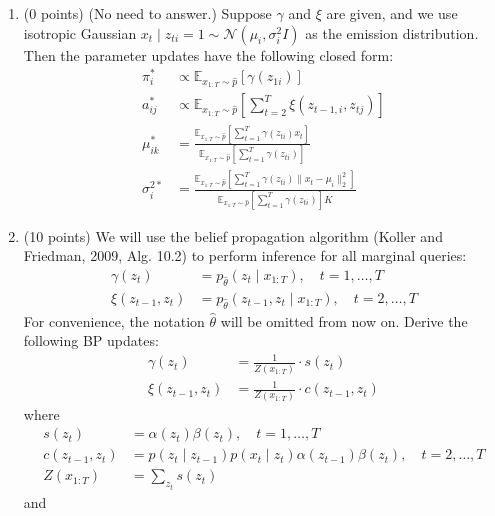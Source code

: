 \documentclass[a3paper,12pt]{extarticle} %
\begin{document}
\begin{enumerate}
\begin{enumerate}
    \item (0 points) (No need to answer.) Suppose $\gamma$ and $\xi$ are given, and we use isotropic Gaussian $x_t \mid z_{ti} = 1 \sim \mathcal{N}(\mu_i, \sigma_i^2 I)$ as the emission distribution. Then the parameter updates have the following closed form:
    \begin{align}
        \pi_i^* &\propto \mathbb{E}_{x_{1:T} \sim \hat{p}} [\gamma(z_{1i})] \tag{14} \\
        a_{ij}^* &\propto \mathbb{E}_{x_{1:T} \sim \hat{p}} \left[ \sum_{t=2}^{T} \xi(z_{t-1,i}, z_{tj}) \right] \tag{15} \\
        \mu_{ik}^* &= \frac{\mathbb{E}_{x_{1:T} \sim \hat{p}} \left[ \sum_{t=1}^{T} \gamma(z_{ti}) x_t \right]}{\mathbb{E}_{x_{1:T} \sim \hat{p}} \left[ \sum_{t=1}^{T} \gamma(z_{ti}) \right]} \tag{16} \\
        \sigma_i^{2*} &= \frac{\mathbb{E}_{x_{1:T} \sim \hat{p}} \left[ \sum_{t=1}^{T} \gamma(z_{ti}) \|x_t - \mu_i\|_2^2 \right]}{\mathbb{E}_{x_{1:T} \sim \hat{p}} \left[ \sum_{t=1}^{T} \gamma(z_{ti}) \right] K} \tag{17}
    \end{align}
    \item (10 points) We will use the belief propagation algorithm (Koller and Friedman, 2009, Alg. 10.2) to perform inference for all marginal queries:
    \begin{align}
        \gamma(z_t) &= p_{\hat{\theta}}(z_t \mid x_{1:T}), \quad t = 1, \ldots, T \tag{18} \\
        \xi(z_{t-1}, z_t) &= p_{\hat{\theta}}(z_{t-1}, z_t \mid x_{1:T}), \quad t = 2, \ldots, T \tag{19}
    \end{align}
    For convenience, the notation $\hat{\theta}$ will be omitted from now on. Derive the following BP updates:
    \begin{align}
        \gamma(z_t) &= \frac{1}{Z(x_{1:T})} \cdot s(z_t) \tag{20} \\
        \xi(z_{t-1}, z_t) &= \frac{1}{Z(x_{1:T})} \cdot c(z_{t-1}, z_t) \tag{21}
    \end{align}
    where
    \begin{align}
        s(z_t) &= \alpha(z_t) \beta(z_t), \quad t = 1, \ldots, T \tag{23} \\
        c(z_{t-1}, z_t) &= p(z_t \mid z_{t-1}) p(x_t \mid z_t) \alpha(z_{t-1}) \beta(z_t), \quad t = 2, \ldots, T \tag{24} \\
        Z(x_{1:T}) &= \sum_{z_t} s(z_t) \tag{25}
    \end{align}
    and
    \begin{align}

\end{align}
\end{enumerate}
\end{enumerate}
\end{document}
